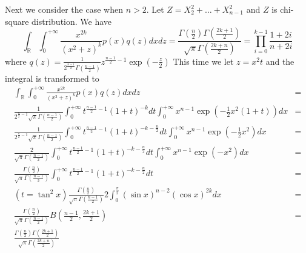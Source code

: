 \documentclass{article}
\def\R{\mathbb{R}}
\begin{document}
Next we consider the case when $n>2$.
Let $Z = X_2^2 + \dots + X_{n-1}^2$ and $Z$ is chi-square distribution.
We have
\begin{equation}\label{eq:n3}
\int_{\R}\int_{0}^{+\infty} \frac{x^{2k}}{(x^2+z)^k} p(x)q(z)dxdz
= \frac{\Gamma(\frac{n}{2}) \Gamma(\frac{2k+1}{2})}
{\sqrt{\pi} \Gamma(\frac{2k+n}{2})} = \prod_{i=0}^{k-1} \frac{1+2i}{n+2i}
\end{equation}
where $q(z) = \frac{1}{2^{\frac{n-1}{2}}\Gamma(\frac{n-1}{2})}
z ^{\frac{n-1}{2} - 1} \exp(-\frac{z}{2})$
This time we let $z=x^2 t$ and the integral is transformed to
\begin{align*}
\int_{\R}\int_{0}^{+\infty} \frac{x^{2k}}{(x^2+z)^k} p(x)q(z)dxdz & = \\
\frac{1}{2^{\frac{n}{2}-1}\sqrt{\pi}\Gamma(\frac{n-1}{2})}
\int_{0}^{+\infty}t^{\frac{n-1}{2}-1}
(1+t)^{-k}dt\int_{0}^{+\infty}x^{n-1} \exp(-\frac{1}{2}x^2(1+t)) dx &=
\\
\frac{1}{2^{\frac{n}{2}-1}\sqrt{\pi}\Gamma(\frac{n-1}{2})}
\int_{0}^{+\infty}t^{\frac{n-1}{2}-1}(1+t)^{-k-\frac{n}{2}}dt
\int_{0}^{+\infty}x^{n-1} \exp(-\frac{1}{2}x^2) dx &=
\\
\frac{2}{\sqrt{\pi}\Gamma(\frac{n-1}{2})}
\int_{0}^{+\infty}t^{\frac{n-1}{2}-1}(1+t)^{-k-\frac{n}{2}}dt
\int_{0}^{+\infty}x^{n-1} \exp(-x^2) dx &=
\\
\frac{\Gamma(\frac{n}{2})}{\sqrt{\pi}\Gamma(\frac{n-1}{2})}
\int_{0}^{+\infty}t^{\frac{n-1}{2}-1}(1+t)^{-k-\frac{n}{2}}dt
&= \\ (t=\tan^2 x)
\frac{\Gamma(\frac{n}{2})}{\sqrt{\pi}\Gamma(\frac{n-1}{2})}
2 \int_0^{\frac{\pi}{2}} (\sin x)^{n-2} (\cos x)^{2k} dx
&= \\ \frac{\Gamma(\frac{n}{2})}{\sqrt{\pi}\Gamma(\frac{n-1}{2})}
B(\frac{n-1}{2}, \frac{2k+1}{2})
&= \\ \frac{\Gamma(\frac{n}{2})\Gamma(\frac{2k+1}{2})}
{\sqrt{\pi} \Gamma(\frac{2k+n}{2})}
\end{align*}
\end{document}
